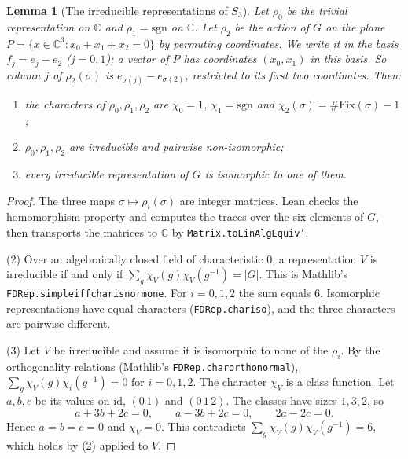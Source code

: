 \documentclass[11pt]{article}
\renewcommand{\_}{\oldus\allowbreak}
\newtheorem{lemma}[theorem]{Lemma}
\theoremstyle{definition}
\theoremstyle{remark}
\begin{document}
\begin{lemma}[The irreducible representations of $S_3$]\label{lem:irr}
Let $\rho_0$ be the trivial representation on $\mathbb C$ and $\rho_1=\mathrm{sgn}$ on $\mathbb C$.
Let $\rho_2$ be the action of $G$ on the plane $P=\{x\in\mathbb C^3:x_0+x_1+x_2=0\}$ by permuting
coordinates. We write it in the basis $f_j=e_j-e_2$ ($j=0,1$); a vector of $P$ has coordinates
$(x_0,x_1)$ in this basis. So column $j$ of $\rho_2(\sigma)$ is $e_{\sigma(j)}-e_{\sigma(2)}$,
restricted to its first two coordinates. Then:
\begin{enumerate}
\item the characters of $\rho_0,\rho_1,\rho_2$ are $\chi_0=1$, $\chi_1=\mathrm{sgn}$ and
$\chi_2(\sigma)=\#\mathrm{Fix}(\sigma)-1$;
\item $\rho_0,\rho_1,\rho_2$ are irreducible and pairwise non-isomorphic;
\item every irreducible representation of $G$ is isomorphic to one of them.
\end{enumerate}
\end{lemma}
\begin{proof}
The three maps $\sigma\mapsto\rho_i(\sigma)$ are integer matrices. Lean checks the homomorphism
property and computes the traces over the six elements of $G$, then transports the matrices to
$\mathbb C$ by \texttt{Matrix.toLinAlgEquiv'}.

(2) Over an algebraically closed field of characteristic $0$, a representation $V$ is irreducible if
and only if $\sum_g\chi_V(g)\chi_V(g^{-1})=|G|$. This is Mathlib's
\texttt{FDRep.simple\_iff\_char\_is\_norm\_one}. For $i=0,1,2$ the sum equals $6$. Isomorphic
representations have equal characters (\texttt{FDRep.char\_iso}), and the three characters are
pairwise different.

(3) Let $V$ be irreducible and assume it is isomorphic to none of the $\rho_i$. By the orthogonality
relations (Mathlib's \texttt{FDRep.char\_orthonormal}),
$\sum_g\chi_V(g)\chi_i(g^{-1})=0$ for $i=0,1,2$. The character $\chi_V$ is a class function. Let
$a,b,c$ be its values on $\mathrm{id}$, $(0\,1)$ and $(0\,1\,2)$. The classes have sizes $1,3,2$,
so
\[
a+3b+2c=0,\qquad a-3b+2c=0,\qquad 2a-2c=0 .
\]
Hence $a=b=c=0$ and $\chi_V=0$. This contradicts $\sum_g\chi_V(g)\chi_V(g^{-1})=6$, which holds by
(2) applied to $V$.
\end{proof}
\end{document}
